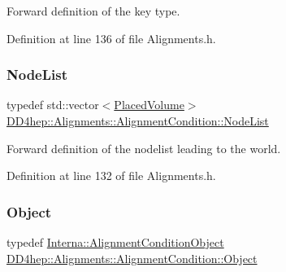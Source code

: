 Forward definition of the key type. 



Definition at line 136 of file Alignments.\+h.

\hypertarget{class_d_d4hep_1_1_alignments_1_1_alignment_condition_ae1ff696352ce5e8726973ea89cf80d8a}{}\label{class_d_d4hep_1_1_alignments_1_1_alignment_condition_ae1ff696352ce5e8726973ea89cf80d8a} 
\subsubsection{\texorpdfstring{Node\+List}{NodeList}}
{\footnotesize\ttfamily typedef std\+::vector$<$\hyperlink{class_d_d4hep_1_1_alignments_1_1_alignment_condition_a4d73434f31bcdf1c29d271c14b9122cb}{Placed\+Volume}$>$ \hyperlink{class_d_d4hep_1_1_alignments_1_1_alignment_condition_ae1ff696352ce5e8726973ea89cf80d8a}{D\+D4hep\+::\+Alignments\+::\+Alignment\+Condition\+::\+Node\+List}}



Forward definition of the nodelist leading to the world. 



Definition at line 132 of file Alignments.\+h.

\hypertarget{class_d_d4hep_1_1_alignments_1_1_alignment_condition_aad9d743ab04b8eb38063249c6a9e16c0}{}\label{class_d_d4hep_1_1_alignments_1_1_alignment_condition_aad9d743ab04b8eb38063249c6a9e16c0} 
\subsubsection{\texorpdfstring{Object}{Object}}
{\footnotesize\ttfamily typedef \hyperlink{class_d_d4hep_1_1_alignments_1_1_interna_1_1_alignment_condition_object}{Interna\+::\+Alignment\+Condition\+Object} \hyperlink{class_d_d4hep_1_1_alignments_1_1_alignment_condition_aad9d743ab04b8eb38063249c6a9e16c0}{D\+D4hep\+::\+Alignments\+::\+Alignment\+Condition\+::\+Object}}



